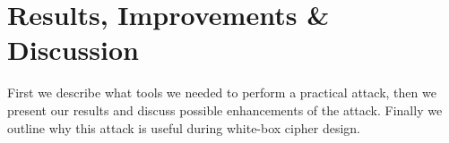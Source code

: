 \chapter{Results, Improvements \& Discussion}
\label{chap:results}

First we describe what tools we needed to perform a practical attack, then we present our results and discuss possible enhancements of the attack. Finally we outline why this attack is useful during white-box cipher design.










